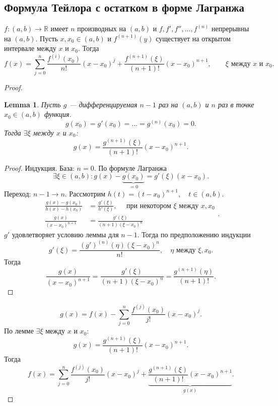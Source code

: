 \documentclass[11pt]{book}
\newcommand{\R}{\mathbb{R}}
\theoremstyle{definition}
\theoremstyle{plain}
\theoremstyle{plain}
\newtheorem*{lm}{Lemma}
\theoremstyle{definition}
\theoremstyle{remark}
\begin{document}
\subsection{Формула Тейлора с остатком в форме Лагранжа} 
\begin{thm}
    $ f: (a, b) \to  \R$ имеет $ n$ производных на $ (a,b)$ и $f, f', f'', \ldots, f^{(n)}$  непрерывны на $ (a, b)$.
    Пусть $ x, x_0 \in (a, b)$ и $ f^{(n+1)}(y)$ существует на открытом интервале между $ x$ и $ x_0$.
    Тогда 
    \[
	f(x)=	\sum _{j=0}^{n}\frac{f^{(i)} (x_0)}{n!}(x-x_0)^{j} + \frac{f^{(n+1)}(\xi)}{(n+1)!} (x-x_0)^{n+1}, \qquad \xi \text{ между } x  \text{ и } x_0
    .\] 
\end{thm}
\begin{proof}
    \begin{lm}
	Пусть $ g$ --- дифференцируемая $ n-1$ раз на $(a, b)$ и $ n$ раз в точке $ x_0 \in (a, b)$ функция. \[
	    g(x_0) = g'(x_0) = \ldots = g^{(n)}(x_0) = 0
	.\]  
	Тогда $ \exists \xi$ между $ x$ и $ x_0$: \[
	    g(x) = \frac{g^{(n+1)}(\xi)}{(n+1)!}(x-x_0)^{n+1}
	.\] 
    \end{lm}
    \begin{proof}
        Индукция. База: $ n = 0$. По формуле Лагранжа
	\[
	    \exists \xi \in (a, b): g(x) - \underbrace{g(x_0)}_{=0} = g'(\xi)(x-x_0)
	.\] 
	Переход: $ n-1 \to  n$.
	Рассмотрим $ h(t) = (t - x_0)^{n+1}, \quad t \in (a, b)$.
	\[
	    \begin{aligned}
		\frac{g(x) - g(x_0)}{h(x) - h(x_0)} &=\frac{g'(\xi)}{h'(\xi)}, \quad \text{ при некотором } \xi \text{ между } x, x_0\\
		\frac{g(x)}{(x-x_0)^{n+1}} &= \frac{g'(\xi)}{(n+1)({\xi - x_0})^{n}}
	    \end{aligned}
	.\] 
	$ g'$ удовлетворяет условию леммы для  $ n-1$. Тогда по предположению индукции 
	 \[
	     g'(\xi) = \frac{(g')^{(n)}(\eta)(\xi - x_0)^{n}}{n!}, \quad \eta \text{ между } \xi, x_0
	.\] 
	Тогда 
	\[
	    \frac{g(x)}{(x-x_0)^{n+1}}	=    \frac{g'(\xi)}{(n+1)({\xi - x_0})^{n}} = \frac{g^{(n+1)}(\eta)}{(n+1)!}
	.\] 
    \end{proof}
    \[
	g(x) = f(x) - \sum_{j=0}^{n}\frac{f^{(j)}(x_0)}{j!} (x-x_0)^{j}
    .\] 
    По лемме $ \exists \xi$ между $ x$ и $ x_0$:
    \[
	    g(x) = \frac{g^{(n+1)}(\xi)}{(n+1)!}(x-x_0)^{n+1}
	.\] 
	Тогда 
	\[
	    f(x) = 
	    \sum_{j=0}^{n}\frac{f^{(j)}(x_0)}{j!} (x-x_0)^{j}  +  \underbrace{\frac{g^{(n+1)}(\xi)}{(n+1)!}(x-x_0)^{n+1}}_{g(x)}
	.\] 

\end{proof}
\end{document}
